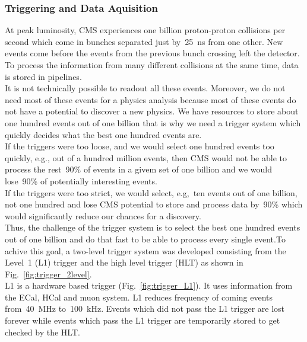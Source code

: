 \subsubsection{Triggering and Data Aquisition}

At peak luminosity, CMS experiences one billion proton-proton collisions per second which come in bunches separated just by~25~ns from one other. New events come before the events from the previous bunch crossing left the detector. To process the information from many different collisions at the same time, data is stored in pipelines. \\

It is not technically possible to readout all these events. Moreover, we do not need most of these events for a physics analysis because most of these events do not have a potential to discover a new physics. We have resources to store about one hundred events out of one billion that is why we need a trigger system which quickly decides what the best one hundred events are.\\

If the triggers were too loose, and we would select one hundred events too quickly, e.g., out of a hundred million events, then CMS would not be able to process the rest~90\% of events in a givem set of one billion and we would lose~90\% of potentially interesting events.\\

If the triggers were too strict, we would select, e.g,~ten events out of one billion, not one hundred and lose CMS potential to store and process data by~90\% which would significantly reduce our chances for a discovery.\\

Thus, the challenge of the trigger system is to select the best one hundred events out of one billion and do that fast to be able to process every single event.To achive this goal, a two-level trigger system was developed consisting from the Level~1 (L1) trigger and the high level trigger (HLT) as shown in Fig.~\ref{fig:trigger_2level}.\\

L1 is a hardware based trigger (Fig.~\ref{fig:trigger_L1}). It uses information from the ECal, HCal and muon system. L1 reduces frequency of coming events from~40~MHz to~100~kHz. Events which did not pass the L1 trigger are lost forever while events which pass the L1 trigger are temporarily stored to get checked by the HLT.\\

